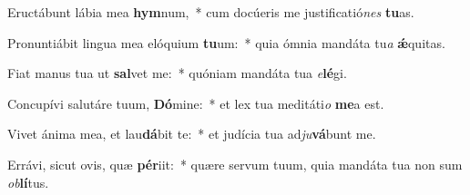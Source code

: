 \item Eructábunt lábia mea \textbf{hym}num,~* cum docúeris me justificatió\textit{nes} \textbf{tu}as.
\item Pronuntiábit lingua mea elóquium \textbf{tu}um:~* quia ómnia mandáta tu\textit{a} \textbf{ǽ}quitas.
\item Fiat manus tua ut \textbf{sal}vet me:~* quóniam mandáta tua \textit{e}\textbf{lé}gi.
\item Concupívi salutáre tuum, \textbf{Dó}mine:~* et lex tua meditáti\textit{o} \textbf{me}a est.
\item Vivet ánima mea, et lau\textbf{dá}bit te:~* et judícia tua ad\textit{ju}\textbf{vá}bunt me.
\item Errávi, sicut ovis, quæ \textbf{pér}iit:~* quære servum tuum, quia mandáta tua non sum \textit{ob}\textbf{lí}tus.
